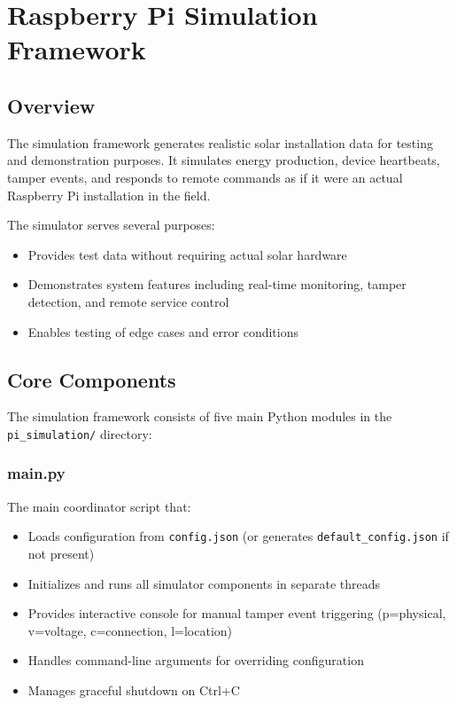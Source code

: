 \documentclass[
]{elteikthesis}[2024/04/26]
\begin{document}
\cleardoublepage

\appendix
\chapter{Raspberry Pi Simulation Framework}

\section{Overview}
The simulation framework generates realistic solar installation data for testing and demonstration purposes. It simulates energy production, device heartbeats, tamper events, and responds to remote commands as if it were an actual Raspberry Pi installation in the field.

The simulator serves several purposes:
\begin{itemize}
    \item Provides test data without requiring actual solar hardware
    \item Demonstrates system features including real-time monitoring, tamper detection, and remote service control
    \item Enables testing of edge cases and error conditions
\end{itemize}

\section{Core Components}
The simulation framework consists of five main Python modules in the \texttt{pi\_simulation/} directory:

\subsection{main.py}
The main coordinator script that:
\begin{itemize}
    \item Loads configuration from \texttt{config.json} (or generates \texttt{default\_config.json} if not present)
    \item Initializes and runs all simulator components in separate threads
    \item Provides interactive console for manual tamper event triggering (p=physical, v=voltage, c=connection, l=location)
    \item Handles command-line arguments for overriding configuration
    \item Manages graceful shutdown on Ctrl+C
\end{itemize}
\end{document}
